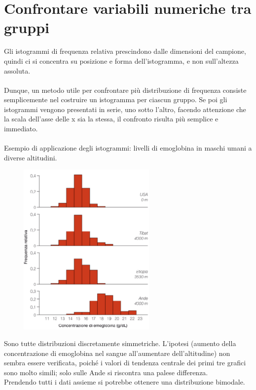 \documentclass[10pt, draft]{book}
\begin{document}
\section{Confrontare variabili numeriche tra gruppi}
Gli istogrammi di frequenza relativa prescindono dalle dimensioni del campione, quindi ci si concentra su posizione e forma dell’istogramma, e non sull’altezza assoluta.
\\
\\
Dunque, un metodo utile per confrontare più distribuzione di frequenza consiste semplicemente nel costruire un istogramma per ciascun gruppo. Se poi gli istogrammi vengono presentati in serie, uno sotto l'altro, facendo attenzione che la scala dell'asse delle x sia la stessa, il confronto risulta più semplice e immediato.
\\
\\
Esempio di applicazione degli istogrammi: livelli di emoglobina in maschi umani a diverse altitudini.
    \begin{figure}[h]\label{fig2.4-1}
    \centering
    \includegraphics[width=0.6\textwidth]{fig2.4-1}
    \caption{\small{}}
    \end{figure}
Sono tutte distribuzioni discretamente simmetriche. L’ipotesi (aumento della concentrazione di emoglobina nel sangue all’aumentare dell’altitudine) non sembra essere verificata, poiché i valori di tendenza centrale dei primi tre grafici sono molto simili; solo sulle Ande si riscontra una palese differenza.
\\
Prendendo tutti i dati assieme si potrebbe ottenere una distribuzione bimodale.
\\
\end{document}
